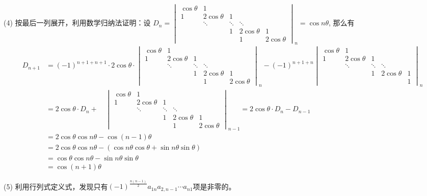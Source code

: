 \documentclass[a4paper]{book}
\begin{document}
\item[(4)] 按最后一列展开，利用数学归纳法证明：设
$D_n = \begin{vmatrix} \cos\theta & 1 & & & \\ 1 & 2\cos\theta & 1 & & \\ & \ddots & \ddots & \ddots & \\ & & 1 & 2\cos\theta & 1 \\ & & & 1 & 2\cos\theta \end{vmatrix}_n = \cos n\theta$, 那么有
\begin{align*}
    D_{n+1} & = (-1)^{n+1+n+1} \cdot 2\cos\theta \cdot \begin{vmatrix} \cos\theta & 1 & & & \\ 1 & 2\cos\theta & 1 & & \\ & \ddots & \ddots & \ddots & \\ & & 1 & 2\cos\theta & 1 \\ & & & 1 & 2\cos\theta \end{vmatrix}_{n} - (-1)^{n+1+n}\begin{vmatrix} \cos\theta & 1 & & & \\ 1 & 2\cos\theta & 1 & & \\ & \ddots & \ddots & \ddots & \\ & & 1 & 2\cos\theta & 1 \\ & & & & 1 \end{vmatrix}_{n} \\
    & = 2\cos\theta \cdot D_{n} + \quad \begin{vmatrix} \cos\theta & 1 & & & \\ 1 & 2\cos\theta & 1 & & \\ & \ddots & \ddots & \ddots & \\ & & 1 & 2\cos\theta & 1 \\ & & & 1 & 2\cos\theta \end{vmatrix}_{n-1} = 2\cos\theta \cdot D_{n} - D_{n-1} \\
    & = 2\cos\theta \cos n\theta - \cos (n-1)\theta \\
    & = 2\cos\theta \cos n\theta - (\cos n\theta \cos\theta + \sin n\theta \sin\theta) \\ 
    & = \cos\theta \cos n\theta - \sin n\theta \sin\theta \\
    & = \cos (n+1)\theta
\end{align*}

\item[(5)] 利用行列式定义式，发现只有$(-1)^{\frac{n(n-1)}{2}}a_{1n}a_{2,n-1}\cdots a_{n1}$项是非零的。
\end{document}

